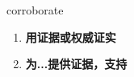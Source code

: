
\begin{frame}
{\huge corroborate}
\begin{center}
\begin{enumerate}\Large
  \item \textbf{用证据或权威证实}
  \item \textbf{为...提供证据，支持}
\end{enumerate}
\end{center}
\end{frame}
